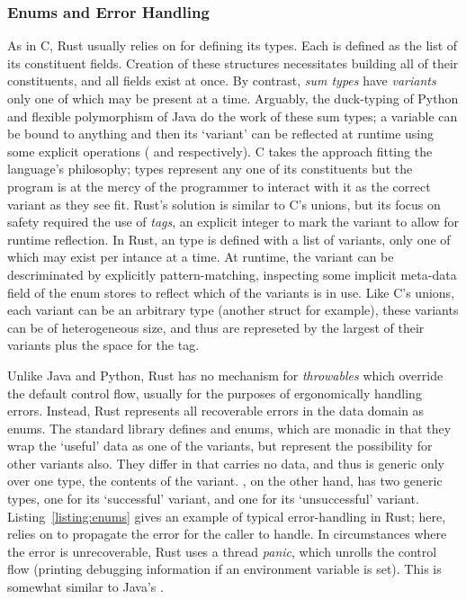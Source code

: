 \subsubsection{Enums and Error Handling}
As in C, Rust usually relies on  for defining its types. Each is defined as the list of its constituent fields. Creation of these structures necessitates building all of their constituents, and all fields exist at once. By contrast, \textit{sum types} have \textit{variants} only one of which may be present at a time. Arguably, the duck-typing of Python and flexible polymorphism of Java do the work of these sum types; a variable can be bound to anything and then its `variant' can be reflected at runtime using some explicit operations ( and  respectively). C takes the approach fitting the language's philosophy;  types represent any one of its constituents but the program is at the mercy of the programmer to interact with it as the correct variant as they see fit. Rust's solution is similar to C's unions, but its focus on safety required the use of \textit{tags}, an explicit integer to mark the variant to allow for runtime reflection. In Rust, an  type is defined with a list of variants, only one of which may exist per intance at a time. At runtime, the variant can be descriminated by explicitly pattern-matching, inspecting some implicit meta-data field of the enum stores to reflect which of the variants is in use. Like C's unions, each variant can be an arbitrary type (another struct for example), these variants can be of heterogeneous size, and thus are represeted by the largest of their variants plus the space for the tag. 

Unlike Java and Python, Rust has no mechanism for \textit{throwables} which override the default control flow, usually for the purposes of ergonomically handling errors. Instead, Rust represents all recoverable errors in the data domain as enums. The standard library defines  and  enums, which are monadic in that they wrap the `useful' data as one of the variants, but represent the possibility for other variants also. They differ in that  carries no data, and thus  is generic only over one type, the contents of the  variant. , on the other hand, has two generic types, one for its `successful'  variant, and one for its `unsuccessful'  variant. Listing~\ref{listing:enums} gives an example of typical error-handling in Rust; here,  relies on  to propagate the error for the caller to handle. In circumstances where the error is unrecoverable, Rust uses a thread \textit{panic}, which unrolls the control flow (printing debugging information if an environment variable is set). This is somewhat similar to Java's .


